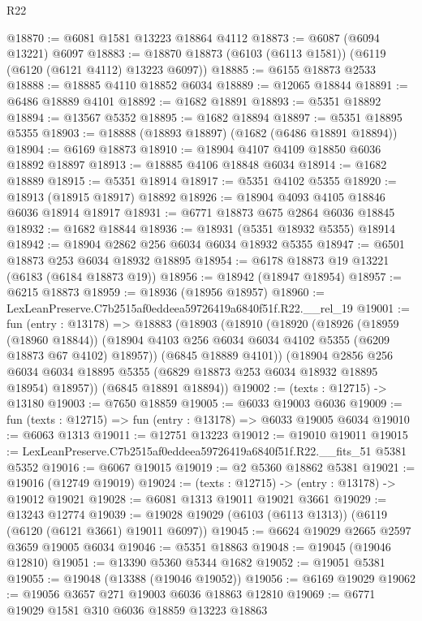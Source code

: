 \begin{lexlean}{R22}
\begin{coremodule}
@18870 := @6081 @1581 @13223 @18864 @4112
@18873 := @6087 (@6094 @13221) @6097
@18883 := @18870 @18873 (@6103 (@6113 @1581)) (@6119 (@6120 (@6121 @4112) @13223 @6097))
@18885 := @6155 @18873 @2533
@18888 := @18885 @4110 @18852 @6034
@18889 := @12065 @18844
@18891 := @6486 @18889 @4101
@18892 := @1682 @18891
@18893 := @5351 @18892
@18894 := @13567 @5352
@18895 := @1682 @18894
@18897 := @5351 @18895 @5355
@18903 := @18888 (@18893 @18897) (@1682 (@6486 @18891 @18894))
@18904 := @6169 @18873
@18910 := @18904 @4107 @4109 @18850 @6036 @18892 @18897
@18913 := @18885 @4106 @18848 @6034
@18914 := @1682 @18889
@18915 := @5351 @18914
@18917 := @5351 @4102 @5355
@18920 := @18913 (@18915 @18917) @18892
@18926 := @18904 @4093 @4105 @18846 @6036 @18914 @18917
@18931 := @6771 @18873 @675 @2864 @6036 @18845
@18932 := @1682 @18844
@18936 := @18931 (@5351 @18932 @5355) @18914
@18942 := @18904 @2862 @256 @6034 @6034 @18932 @5355
@18947 := @6501 @18873 @253 @6034 @18932 @18895
@18954 := @6178 @18873 @19 @13221 (@6183 (@6184 @18873 @19))
@18956 := @18942 (@18947 @18954)
@18957 := @6215 @18873
@18959 := @18936 (@18956 @18957)
@18960 := LexLeanPreserve.C7b2515af0eddeea59726419a6840f51f.R22.__rel_19
@19001 := fun (entry : @13178) =>
  @18883
    (@18903
      (@18910
        (@18920
          (@18926
            (@18959 (@18960 @18844))
            (@18904 @4103 @256 @6034 @6034 @4102 @5355 (@6209 @18873 @67 @4102) @18957))
          (@6845 @18889 @4101))
        (@18904
          @2856
          @256
          @6034
          @6034
          @18895
          @5355
          (@6829 @18873 @253 @6034 @18932 @18895 @18954)
          @18957))
      (@6845 @18891 @18894))
@19002 := (texts : @12715) -> @13180
@19003 := @7650 @18859
@19005 := @6033 @19003 @6036
@19009 := fun (texts : @12715) => fun (entry : @13178) => @6033 @19005 @6034
@19010 := @6063 @1313
@19011 := @12751 @13223
@19012 := @19010 @19011
@19015 := LexLeanPreserve.C7b2515af0eddeea59726419a6840f51f.R22.__fits_51 @5381 @5352
@19016 := @6067 @19015
@19019 := @2 @5360 @18862 @5381
@19021 := @19016 (@12749 @19019)
@19024 := (texts : @12715) -> (entry : @13178) -> @19012 @19021
@19028 := @6081 @1313 @19011 @19021 @3661
@19029 := @13243 @12774
@19039 := @19028 @19029 (@6103 (@6113 @1313)) (@6119 (@6120 (@6121 @3661) @19011 @6097))
@19045 := @6624 @19029 @2665 @2597 @3659 @19005 @6034
@19046 := @5351 @18863
@19048 := @19045 (@19046 @12810)
@19051 := @13390 @5360 @5344 @1682
@19052 := @19051 @5381
@19055 := @19048 (@13388 (@19046 @19052))
@19056 := @6169 @19029
@19062 := @19056 @3657 @271 @19003 @6036 @18863 @12810
@19069 := @6771 @19029 @1581 @310 @6036 @18859 @13223 @18863

\end{coremodule}
\end{lexlean}
